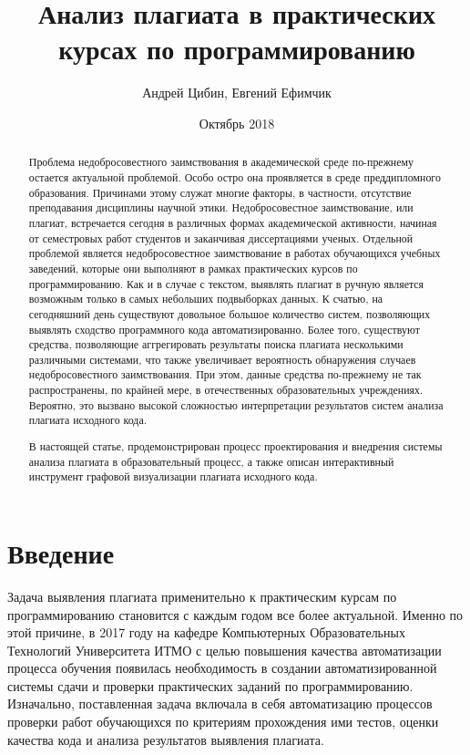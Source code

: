 \documentclass{article}
\title{Анализ плагиата в практических курсах по программированию}
\author{Андрей Цибин, Евгений Ефимчик}
\date{Октябрь 2018}
\begin{document}
\maketitle

\begin{abstract}

Проблема недобросовестного заимствования в академической среде по-прежнему остается актуальной проблемой. Особо остро она проявляется в среде преддипломного образования. Причинами этому служат многие факторы, в частности, отсутствие преподавания дисциплины научной этики. Недобросовестное заимствование, или плагиат, встречается сегодня в различных формах академической активности, начиная от семестровых работ студентов и заканчивая диссертациями ученых. Отдельной проблемой является недобросовестное заимствование в работах обучающихся учебных заведений, которые они выполняют в рамках практических курсов по программированию. Как и в случае с текстом, выявлять плагиат в ручную является возможным только в самых небольших подвыборках данных. К счатью, на сегодняшний день существуют довольное большое количество систем, позволяющих выявлять сходство программного кода автоматизированно. Более того, существуют средства, позволяющие аггрегировать результаты поиска плагиата несколькими различными системами, что также увеличивает вероятность обнаружения случаев недобросовестного заимствования. При этом, данные средства по-прежнему не так распространены, по крайней мере, в отечественных образовательных учреждениях. Вероятно, это вызвано высокой сложностью интерпретации результатов систем анализа плагиата исходного кода.

В настоящей статье, продемонстрирован процесс проектирования и внедрения системы анализа плагиата в образовательный процесс, а также описан интерактивный инструмент графовой визуализации плагиата исходного кода.

\end{abstract}

\section{Введение}

Задача выявления плагиата применительно к практическим курсам по программированию становится с каждым годом все более актуальной. Именно по этой причине, в 2017 году на кафедре Компьютерных Образовательных Технологий Университета ИТМО с целью повышения качества автоматизации процесса обучения появилась необходимость в создании автоматизированной системы сдачи и проверки практических заданий по программированию. Изначально, поставленная задача включала в себя автоматизацию процессов проверки работ обучающихся по критериям прохождения ими тестов, оценки качества кода и анализа результатов выявления плагиата.
\end{document}
